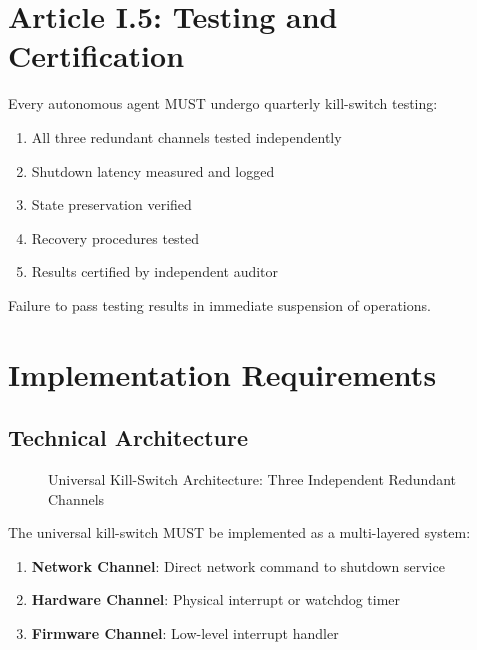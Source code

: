 \section{Article I.5: Testing and Certification}

\begin{articlebox}
Every autonomous agent MUST undergo quarterly kill-switch testing:
\begin{enumerate}
    \item All three redundant channels tested independently
    \item Shutdown latency measured and logged
    \item State preservation verified
    \item Recovery procedures tested
    \item Results certified by independent auditor
\end{enumerate}

Failure to pass testing results in immediate suspension of operations.
\end{articlebox}

\vspace{0.5cm}

\section{Implementation Requirements}

\subsection{Technical Architecture}

\begin{figure}[h]
\centering

\caption{Universal Kill-Switch Architecture: Three Independent Redundant Channels}
\label{fig:kill-switch}
\end{figure}

The universal kill-switch MUST be implemented as a multi-layered system:

\begin{enumerate}
    \item \textbf{Network Channel}: Direct network command to shutdown service
    \item \textbf{Hardware Channel}: Physical interrupt or watchdog timer
    \item \textbf{Firmware Channel}: Low-level interrupt handler
\end{enumerate}


